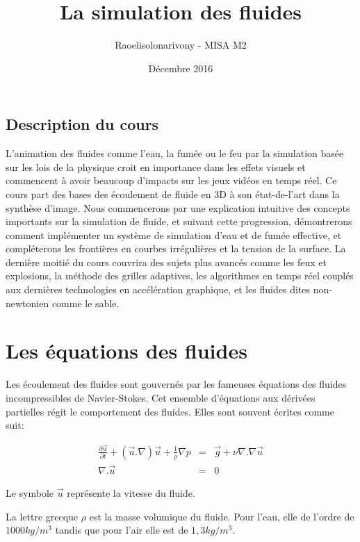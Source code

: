 \documentclass[11pt]{report}
\title{La simulation des fluides}
\author{Raoelisolonarivony - MISA M2}
\date{Décembre 2016}
\begin{document}
\maketitle

\section*{Description du cours}

L'animation des fluides comme l'eau, la fumée ou le feu par la simulation basée sur les lois de la physique croit en importance dans les effets visuels et commencent à avoir beaucoup d'impacts sur les jeux vidéos en temps réel. Ce cours part des bases des écoulement de fluide en 3D à son état-de-l'art dans la synthèse d'image. Nous commencerons par une explication intuitive des concepts importants sur la simulation de fluide, et suivant cette progression, démontrerons comment implémenter un système de simulation d'eau et de fumée effective, et compléterons les frontières en courbes irrégulières et  la tension de la surface. La dernière moitié du cours couvrira des sujets plus avancés comme les feux et explosions, la méthode des grilles adaptives, les algorithmes en temps réel couplés aux dernières technologies en accélération graphique, et les fluides dites non-newtonien comme le sable. 

\chapter{Les équations des fluides}
Les écoulement des fluides sont gouvernés par les fameuses équations des fluides incompressibles de Navier-Stokes. Cet ensemble d'équations aux dérivées partielles régit le comportement des fluides. Elles sont souvent écrites comme suit:

\begin{eqnarray}
\frac{\partial \overrightarrow{u}}{\partial t} + (\overrightarrow{u} . \nabla ) \overrightarrow{u} + \frac{1}{\rho} \nabla p & = & \overrightarrow{g} + \nu \nabla . \nabla \overrightarrow{u} \\
\nabla . \overrightarrow{u} & = & 0
\end{eqnarray}

Le symbole $ \overrightarrow{u} $ représente la vitesse du fluide. \newline

La lettre grecque $  \rho $ est la masse volumique du fluide. Pour l'eau, elle de l'ordre de $ 1000kg/m^3 $ tandis que pour l'air elle est de $ 1,3kg/m^3 $. \newline
\end{document}
